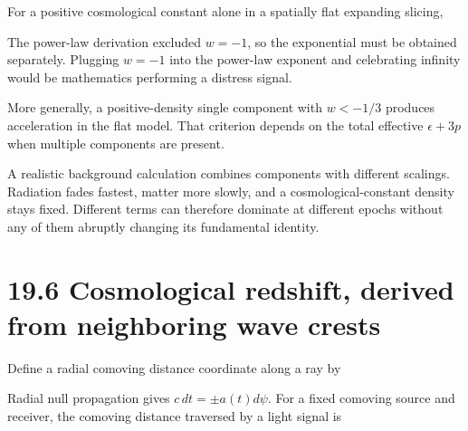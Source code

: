 \documentclass[
  11pt,
  letterpaper,
  oneside,
  openany]{scrbook}
\begin{document}
For a positive cosmological constant alone in a spatially flat expanding
slicing,

\begin{center}
\begingroup
{}
\ifdim\wd\grmathbox>\linewidth
\resizebox{\linewidth}{!}{\usebox{\grmathbox}}
\else\usebox{\grmathbox}\fi
\endgroup
\end{center}

The power-law derivation excluded \(w=-1\), so the exponential must be
obtained separately. Plugging \(w=-1\) into the power-law exponent and
celebrating infinity would be mathematics performing a distress signal.

More generally, a positive-density single component with \(w<-1/3\)
produces acceleration in the flat model. That criterion depends on the
total effective \(\epsilon+3p\) when multiple components are present.

A realistic background calculation combines components with different
scalings. Radiation fades fastest, matter more slowly, and a
cosmological-constant density stays fixed. Different terms can therefore
dominate at different epochs without any of them abruptly changing its
fundamental identity.

\hypertarget{cosmological-redshift-derived-from-neighboring-wave-crests}{%
\section{19.6 Cosmological redshift, derived from neighboring wave
crests}\label{cosmological-redshift-derived-from-neighboring-wave-crests}}

Define a radial comoving distance coordinate along a ray by

\begin{center}
\begingroup
{}
\ifdim\wd\grmathbox>\linewidth
\resizebox{\linewidth}{!}{\usebox{\grmathbox}}
\else\usebox{\grmathbox}\fi
\endgroup
\end{center}

Radial null propagation gives \(c\,dt=\pm a(t)d\psi\). For a fixed
comoving source and receiver, the comoving distance traversed by a light
signal is

\begin{center}
\begingroup
{}
\ifdim\wd\grmathbox>\linewidth
\resizebox{\linewidth}{!}{\usebox{\grmathbox}}
\else\usebox{\grmathbox}\fi
\endgroup
\end{center}
\end{document}
